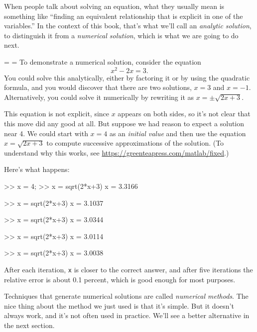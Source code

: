 \documentclass[../../book.tex]{subfiles}
\begin{document}
When people talk about solving an equation, what they usually mean
is something like ``finding an equivalent relationship that is
explicit in one of the variables.''  In the context of this book,
that's what we'll call an \emph{analytic \mbox{solution}}, to distinguish
it from a \emph{numerical solution}, which is what we are going to
do next.


{\binoppenalty=\maxdimen%
\relpenalty=\maxdimen%
To demonstrate a numerical solution, consider the equation 
\begin{equation} \label{e:fzero}
x^2 - 2x = 3.
\end{equation}  
You could solve this analytically, either by factoring it or by
using the quad\-ratic formula, and you would discover that there are
two solutions, $x=3$ and $x=-1$.  Alternatively, you could solve it
numerically by rewriting it as $x = \pm \sqrt{2x+3}$.}

This equation is not explicit, since $x$ appears on both sides, so
it's not clear that this move did any good at all.  But suppose we had
reason to expect a solution near 4.
We could start with $x=4$ as an \emph{initial value} and then use
the equation $x = \sqrt{2x+3}$ to compute successive
approximations of the solution. (To understand why this
works, see \url{https://greenteapress.com/matlab/fixed}.)


Here's what happens:

\begin{code}
>> x = 4;
>> x = sqrt(2*x+3)
x = 3.3166

>> x = sqrt(2*x+3)
x = 3.1037

>> x = sqrt(2*x+3)
x = 3.0344

>> x = sqrt(2*x+3)
x = 3.0114

>> x = sqrt(2*x+3)
x = 3.0038
\end{code}

After each iteration, \lstinline{x} is closer to the correct answer,
and after five iterations the relative error is about 0.1 percent, which
is good enough for most purposes.


Techniques that generate numerical solutions are called
\emph{numerical \mbox{methods}}.
The nice thing about the method we just used is that it's simple.  But it doesn't always
work, and it's not often used in practice.
We'll see a better alternative in the next section.
\end{document}
